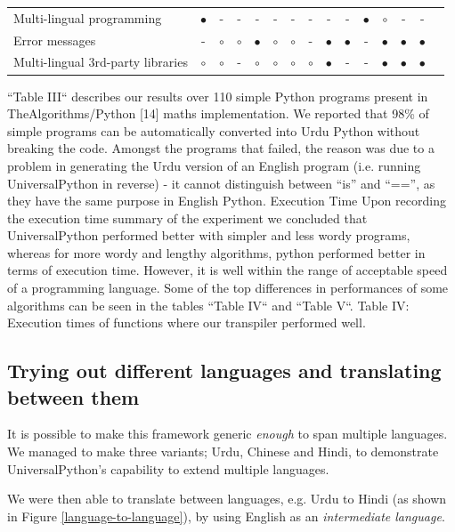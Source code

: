 \documentclass[conference]{IEEEtran}
\begin{document}
\begin{table}[t]
\begin{tabularx}{\textwidth}{l *{14}{c}}
    Multi-lingual programming & $\bullet$ & - & - & - & - & - & - & - & - & $\bullet$ & $\circ$ & - & - \\
    Error messages & - & $\circ$ & $\circ$ & $\bullet$ & $\circ$ & $\circ$ & - & $\bullet$ & $\bullet$ & - & $\bullet$ & $\bullet$ & $\bullet$ \\
    Multi-lingual 3rd-party libraries & $\circ$ & $\circ$ & - & $\circ$ & $\circ$ & $\circ$ & $\circ$ & $\bullet$ & - & - & $\bullet$ & $\bullet$ & $\bullet$ \\
    \hline
    \end{tabularx}
    \end{table}
    

“Table III“ describes our results over 110 simple Python programs present in TheAlgorithms/Python [14] maths implementation.
We reported that 98\% of simple programs can be automatically converted into Urdu Python without breaking the code. Amongst the programs that failed, the reason was due to a problem in generating the Urdu version of an English program (i.e. running UniversalPython in reverse) - it cannot distinguish between “is” and “==”, as they have the same purpose in English Python.
Execution Time Upon recording the execution time summary of the experiment we concluded that UniversalPython performed better with simpler and less wordy programs, whereas for more wordy and lengthy algorithms, python performed better in terms of execution time. However, it is well within the range of acceptable speed of a programming language. Some of the top differences in performances of some algorithms can be seen in the tables “Table IV“ and “Table V“.
Table IV: Execution times of functions where our transpiler performed well.

\subsection{Trying out different languages and translating between them}

It is possible to make this framework generic \textit{enough} to span multiple languages. We managed to make three variants; Urdu, Chinese and Hindi, to demonstrate UniversalPython's capability to extend multiple languages.

We were then able to translate between languages, e.g. Urdu to Hindi (as shown in Figure \ref{language-to-language}), by using English as an \textit{intermediate language}.
\end{document}
